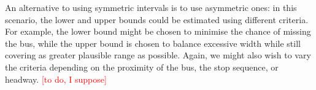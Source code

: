 An alternative to using symmetric intervals is to use asymmetric ones: in this scenario, the lower and upper bounds could be estimated using different criteria. For example, the lower bound might be chosen to minimise the chance of missing the bus, while the upper bound is chosen to balance excessive width while still covering as greater plausible range as possible. Again, we might also wish to vary the criteria depending on the proximity of the bus, the stop sequence, or headway. \textcolor{red}{[to do, I suppose]}
